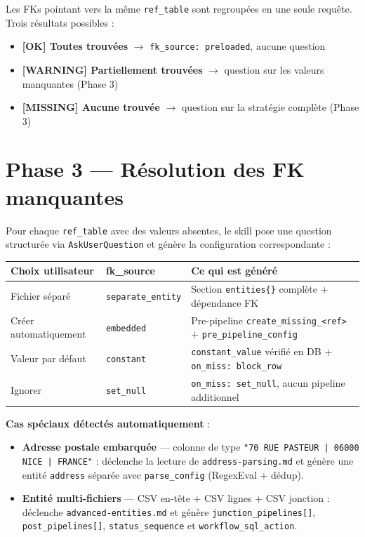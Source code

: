 \noindent Les FKs pointant vers la même \texttt{ref\_table} sont regroupées en une seule
requête. Trois résultats possibles :

\begin{itemize}
  \item \textbf{[OK] Toutes trouvées} $\to$ \texttt{fk\_source: preloaded}, aucune question
  \item \textbf{[WARNING] Partiellement trouvées} $\to$ question sur les valeurs manquantes (Phase 3)
  \item \textbf{[MISSING] Aucune trouvée} $\to$ question sur la stratégie complète (Phase 3)
\end{itemize}

\section*{Phase 3 — Résolution des FK manquantes}

Pour chaque \texttt{ref\_table} avec des valeurs absentes, le skill pose une question
structurée via \texttt{AskUserQuestion} et génère la configuration correspondante :

\begin{center}
\renewcommand{\arraystretch}{1.3}
\begin{tabular}{|p{3.5cm}|p{3.5cm}|p{6.2cm}|}
  \hline
  \textbf{Choix utilisateur} & \textbf{fk\_source} & \textbf{Ce qui est généré} \\
  \hline
  Fichier séparé & \texttt{separate\_entity} & Section \texttt{entities\{\}} complète + dépendance FK \\
  \hline
  Créer automatiquement & \texttt{embedded} & Pre-pipeline \texttt{create\_missing\_<ref>} + \texttt{pre\_pipeline\_config} \\
  \hline
  Valeur par défaut & \texttt{constant} & \texttt{constant\_value} vérifié en DB + \texttt{on\_miss: block\_row} \\
  \hline
  Ignorer & \texttt{set\_null} & \texttt{on\_miss: set\_null}, aucun pipeline additionnel \\
  \hline
\end{tabular}
\end{center}

\noindent\textbf{Cas spéciaux détectés automatiquement} :
\begin{itemize}
  \item \textbf{Adresse postale embarquée} — colonne de type \texttt{"70 RUE PASTEUR | 06000 NICE | FRANCE"} :
        déclenche la lecture de \texttt{address-parsing.md} et génère une entité
        \texttt{address} séparée avec \texttt{parse\_config} (RegexEval + dédup).
  \item \textbf{Entité multi-fichiers} — CSV en-tête + CSV lignes + CSV jonction :
        déclenche \texttt{advanced-entities.md} et génère
        \texttt{junction\_pipelines[]}, \texttt{post\_pipelines[]},
        \texttt{status\_sequence} et \texttt{workflow\_sql\_action}.
\end{itemize}

